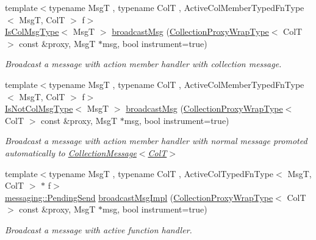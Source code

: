 \begin{DoxyCompactItemize}
{\footnotesize template$<$typename MsgT , typename ColT , Active\+Col\+Member\+Typed\+Fn\+Type$<$ Msg\+T, Col\+T $>$ f$>$ }\\\hyperlink{structvt_1_1vrt_1_1collection_1_1_collection_manager_a21c21612c806016788057aeab142af20}{Is\+Col\+Msg\+Type}$<$ MsgT $>$ \hyperlink{structvt_1_1vrt_1_1collection_1_1_collection_manager_a5ec1684e67f1e5aec6b94cdcf17e5777}{broadcast\+Msg} (\hyperlink{structvt_1_1vrt_1_1collection_1_1_collection_manager_a56458ed7f9bb22b631b9b3a745f42f94}{Collection\+Proxy\+Wrap\+Type}$<$ ColT $>$ const \&proxy, MsgT $\ast$msg, bool instrument=true)
\begin{DoxyCompactList}\small\item\em Broadcast a message with action member handler with collection message. \end{DoxyCompactList}\item 
{\footnotesize template$<$typename MsgT , typename ColT , Active\+Col\+Member\+Typed\+Fn\+Type$<$ Msg\+T, Col\+T $>$ f$>$ }\\\hyperlink{structvt_1_1vrt_1_1collection_1_1_collection_manager_ae376deeefd4f89a0b1c93849977715d9}{Is\+Not\+Col\+Msg\+Type}$<$ MsgT $>$ \hyperlink{structvt_1_1vrt_1_1collection_1_1_collection_manager_a42cfab20eec557ba82f70d90afa3e7a1}{broadcast\+Msg} (\hyperlink{structvt_1_1vrt_1_1collection_1_1_collection_manager_a56458ed7f9bb22b631b9b3a745f42f94}{Collection\+Proxy\+Wrap\+Type}$<$ ColT $>$ const \&proxy, MsgT $\ast$msg, bool instrument=true)
\begin{DoxyCompactList}\small\item\em Broadcast a message with action member handler with normal message promoted automatically to {\ttfamily \hyperlink{structvt_1_1vrt_1_1collection_1_1_collection_message}{Collection\+Message$<$\+Col\+T$>$}} \end{DoxyCompactList}\item 
{\footnotesize template$<$typename MsgT , typename ColT , Active\+Col\+Typed\+Fn\+Type$<$ Msg\+T, Col\+T $>$ $\ast$ f$>$ }\\\hyperlink{structvt_1_1messaging_1_1_pending_send}{messaging\+::\+Pending\+Send} \hyperlink{structvt_1_1vrt_1_1collection_1_1_collection_manager_ac7a9c72784d76ddf0346926bbb147e8c}{broadcast\+Msg\+Impl} (\hyperlink{structvt_1_1vrt_1_1collection_1_1_collection_manager_a56458ed7f9bb22b631b9b3a745f42f94}{Collection\+Proxy\+Wrap\+Type}$<$ ColT $>$ const \&proxy, MsgT $\ast$msg, bool instrument=true)
\begin{DoxyCompactList}\small\item\em Broadcast a message with active function handler. \end{DoxyCompactList}\item 

\end{DoxyCompactItemize}
